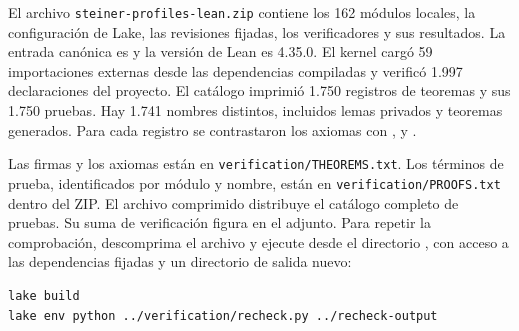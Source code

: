 \documentclass[spanish,11pt,a4paper]{article}
\begin{document}
El archivo \texttt{steiner-profiles-lean.zip} contiene los 162 módulos locales, la configuración de Lake, las revisiones fijadas, los verificadores y sus resultados. La entrada canónica es  y la versión de Lean es 4.35.0. El kernel cargó 59 importaciones externas desde las dependencias compiladas y verificó 1.997 declaraciones del proyecto. El catálogo imprimió 1.750 registros de teoremas y sus 1.750 pruebas. Hay 1.741 nombres distintos, incluidos lemas privados y teoremas generados. Para cada registro se contrastaron los axiomas con ,  y .

Las firmas y los axiomas están en \texttt{verification/THEOREMS.txt}. Los términos de prueba, identificados por módulo y nombre, están en \texttt{verification/PROOFS.txt} dentro del ZIP. El archivo comprimido distribuye el catálogo completo de pruebas. Su suma de verificación figura en el  adjunto. Para repetir la comprobación, descomprima el archivo y ejecute desde el directorio , con acceso a las dependencias fijadas y un directorio de salida nuevo:

\begin{verbatim}
lake build
lake env python ../verification/recheck.py ../recheck-output
\end{verbatim}
\end{document}
